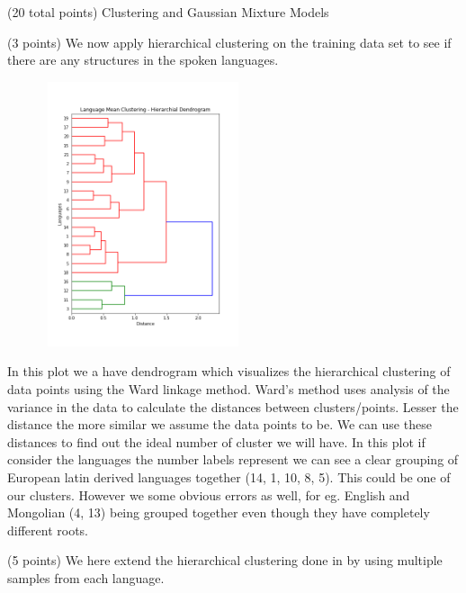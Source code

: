 \documentclass[12pt]{article}
\begin{document}
\begin{question}{(20 total points) Clustering and Gaussian Mixture Models}
\begin{subquestion}{(3 points)
       We now apply hierarchical clustering on the training data set
       to see if there are any structures in the spoken languages.
     }
     

      \begin{answerbox}{35em}
        \begin{center}
            \includegraphics[width=0.6\textwidth, height=21em]{results/3_3.png}
        \end{center}
        In this plot we a have dendrogram which visualizes the hierarchical clustering of data points using the Ward linkage method. Ward's method uses analysis of the variance in the data to calculate the distances between clusters/points. Lesser the distance the more similar we assume the data points to be. We can use these distances to find out the ideal number of cluster we will have. In this plot if consider the languages the number labels represent we can see a clear grouping of European latin derived languages together (14, 1, 10, 8, 5). This could be one of our clusters. However we some obvious errors as well, for eg. English and Mongolian (4, 13) being grouped together even though they have completely different roots.
      \end{answerbox}
  


   \end{subquestion}
   \begin{subquestion}{(5 points)
       We here extend the hierarchical clustering done in  by
       using multiple samples from each language.
     } \label{Q3.4}


   


\end{subquestion}
\end{question}
\end{document}
